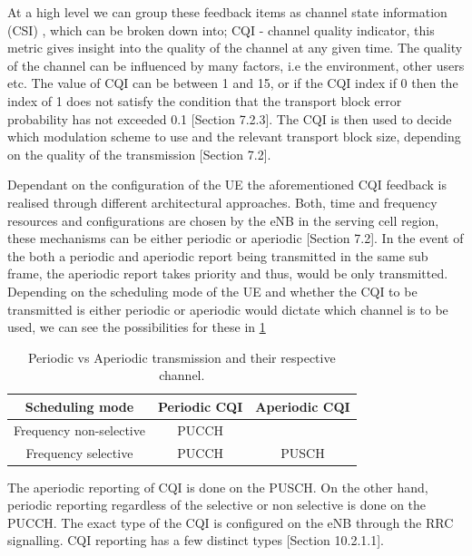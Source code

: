 \documentclass{article}
\begin{document}
At a high level we can group these feedback items as channel state information (CSI) , which can be broken down into; CQI - channel quality indicator, this metric gives insight into the quality of the channel at any given time. The quality of the channel can be influenced by many factors, i.e the environment, other users etc. The value of CQI can be between 1 and 15, or if the CQI index if 0 then the index of 1 does not satisfy the condition that the transport block error probability has not exceeded 0.1 \cite{ETSITS136213}[Section 7.2.3]. The CQI is then used to decide which modulation scheme to use and the relevant transport block size, depending on the quality of the transmission \cite{ETSITS136213}[Section 7.2]. 

Dependant on the configuration of the UE the aforementioned CQI feedback is realised through different architectural approaches. Both, time and frequency resources and configurations are chosen by the eNB in the serving cell region, these mechanisms can be either periodic or aperiodic \cite{ETSITS136213}[Section 7.2]. In the event of the both a periodic and aperiodic report being transmitted in the same sub frame, the aperiodic report takes priority and thus, would be only transmitted.  Depending on the scheduling mode of the UE and whether the CQI to be transmitted is either periodic or aperiodic would dictate which channel is to be used, we can see the possibilities for these in \cref{tab:cqi_aperiod_sel}
\begin{table}[H]
        \centering
     \begin{tabular}{||c c c||} 
     \hline
     Scheduling mode & Periodic CQI & Aperiodic CQI  \\ [0.1ex] 
     \hline\hline
     Frequency non-selective & PUCCH &  \\ 
     \hline
     Frequency selective  & PUCCH & PUSCH\\
     \hline
    \end{tabular}
    \caption{Periodic vs Aperiodic transmission and their respective channel.}
    \label{tab:cqi_aperiod_sel}
\end{table}
The aperiodic reporting of CQI is done on the PUSCH. On the other hand, periodic reporting regardless of the selective or non selective is done on the PUCCH. The exact type of the CQI is configured on the eNB through the RRC signalling. CQI reporting has a few distinct types \cite{umts_sesia}[Section 10.2.1.1]. 
\end{document}
